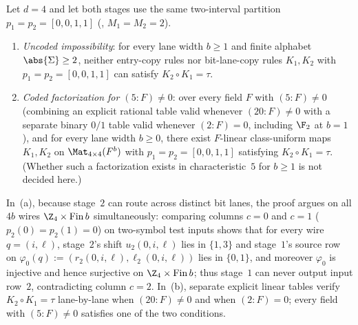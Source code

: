 \begin{example}[Same-interval coded factorizations at $d = 4 = M_1 M_2$ when $(5 : F) \ne 0$]\label{ex:d4-coded}
Let $d = 4$ and let both stages use the same two-interval partition
$p_1 = p_2 = [0, 0, 1, 1]$ (, $M_1 = M_2 = 2$).
\begin{enumerate}[label=(\alph*)]
\item \emph{Uncoded impossibility}: for every lane width $b \ge 1$ and finite alphabet
  $\abs{\Sigma} \ge 2$, neither entry-copy rules nor bit-lane-copy rules $K_1, K_2$ with
  $p_1 = p_2 = [0,0,1,1]$ can satisfy $K_2 \circ K_1 = \tau$.
\item \emph{Coded factorization for $(5 : F) \ne 0$}: over every field $F$ with $(5 : F) \ne 0$
  (combining an explicit rational table valid whenever $(20 : F) \ne 0$ with a separate binary $0/1$
  table valid whenever $(2 : F) = 0$, including $\F_2$ at $b = 1$), and for every lane width
  $b \ge 0$, there exist $F$-linear class-uniform maps $K_1, K_2$ on $\Mat_{4\times 4}(F^b)$ with
  $p_1 = p_2 = [0,0,1,1]$ satisfying $K_2 \circ K_1 = \tau$. (Whether such a factorization exists in
  characteristic~$5$ for $b \ge 1$ is not decided here.)
\end{enumerate}
\end{example}
\begin{outline}
In~(a), because stage~$2$ can route across distinct bit lanes, the proof argues on all $4b$ wires
$\Z_4 \times \mathrm{Fin}\,b$ simultaneously: comparing columns $c = 0$ and $c = 1$
($p_2(0) = p_2(1) = 0$) on two-symbol test inputs shows that for every wire $q = (i, \ell)$,
stage~$2$'s shift $u_2(0, i, \ell)$ lies in $\{1, 3\}$ and stage~$1$'s source row on
$\varphi_0(q) := (r_2(0, i, \ell), \ell_2(0, i, \ell))$ lies in $\{0, 1\}$, and moreover $\varphi_0$
is injective and hence surjective on $\Z_4 \times \mathrm{Fin}\,b$; thus stage~$1$ can never output
input row~$2$, contradicting column $c = 2$. In~(b), separate explicit linear
tables verify $K_2 \circ K_1 = \tau$ lane-by-lane when $(20 : F) \ne 0$ and when $(2 : F) = 0$;
every field with $(5 : F) \ne 0$ satisfies one of the two conditions.
\end{outline}
